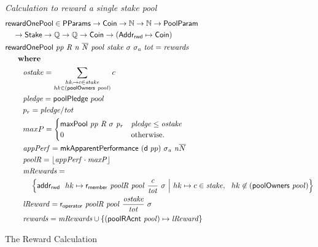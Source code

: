 \begin{figure}[htb]
  \emph{Calculation to reward a single stake pool}
  \begin{align*}
    & \mathsf{rewardOnePool} \in \mathsf{PParams} \to \mathsf{Coin} \to \mathbb{N} \to \mathbb{N} \to \mathsf{PoolParam}\\
    & ~~~\to \mathsf{Stake} \to \mathbb{Q} \to \mathbb{Q} \to \mathsf{Coin} \to (\mathsf{Addr_{rwd}} \mapsto \mathsf{Coin}) \\
     & \mathsf{rewardOnePool}~\mathit{pp}~\mathit{R}~\mathit{n}~\mathit{\overline{N}}~\mathit{pool}~\mathit{stake}~{\sigma}~{\sigma_a}~\mathit{tot} =
         \mathit{rewards}\\
     & ~~~~ ~ \mathbf{where}~ ~  \\
    & ~~~~~~~\mathit{ostake} = \sum_{\substack{
      hk_\mapsto c\in\mathit{stake}\\
      hk\in(\mathsf{poolOwners}~\mathit{pool})\\
      }} c \\
    & ~~~~~~~\mathit{pledge} = \mathsf{poolPledge}~pool \\
    & ~~~~~~~p_{r} = \mathit{pledge} / \mathit{tot} \\
    & ~~~~~~~maxP =
    \begin{cases}
      \mathsf{maxPool}~\mathit{pp}~\mathit{R}~\sigma~\mathit{p_r}&
      \mathit{pledge} \leq \mathit{ostake}\\
      0 & \text{otherwise.}
    \end{cases} \\
    & ~~~~~~~\mathit{appPerf} = \mathsf{mkApparentPerformance}~{(\mathsf{d}~pp)}~\mathit{\sigma_a}~\mathit{n}{\overline{N}} \\
    & ~~~~~~~\mathit{poolR} = \lfloor\mathit{appPerf}\cdot\mathit{maxP}\rfloor \\
    & ~~~~~~~\mathit{mRewards} = \\
    & ~~~~~~~~~~\left\{
                   \mathsf{addr_{rwd}}~ \mathit{~}hk\mapsto\mathsf{r_{member}}~ \mathit{poolR}~ \mathit{pool}~ \mathit{\frac{c}{tot}}~ {\sigma}
                   ~\Big\vert~
                   hk\mapsto c\in\mathit{stake},~~hk \not\in(\mathsf{poolOwners}~\mathit{pool})
                 \right\}\\
    & ~~~~~~~\mathit{lReward} = \mathsf{r_{operator}}~ \mathit{poolR}~ \mathit{pool}~ \mathit{\frac{\mathit{ostake}}{tot}}~ {\sigma} \\
    & ~~~~~~~\mathit{rewards} =
               \mathit{mRewards} \cup
               \{(\mathsf{poolRAcnt}~\mathit{pool})\mapsto\mathit{lReward}\} \\
  \end{align*}
  \caption{The Reward Calculation}
  \label{fig:functions:reward-calc}
\end{figure}
